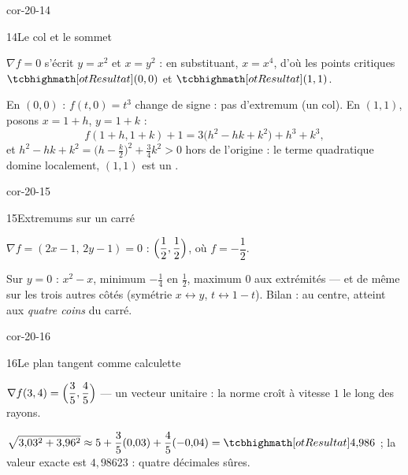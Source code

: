 \begin{blocLivre}{cor-20-14}
\begin{corrige}{14}{Le col et le sommet}
\begin{questions}
  \item $\nabla f=0$ s'écrit $y=x^{2}$ et $x=y^{2}$ : en substituant,
    $x=x^{4}$, d'où les points critiques $\res{(0,0)}$ et
    $\res{(1,1)}$.
  \item En $(0,0)$ : $f(t,0)=t^{3}$ change de signe : pas d'extremum
    (un col). En $(1,1)$, posons $x=1+h$, $y=1+k$ :
    \[
    f(1+h,1+k)+1=3\bigl(h^{2}-hk+k^{2}\bigr)+h^{3}+k^{3},
    \]
    et $h^{2}-hk+k^{2}=\bigl(h-\tfrac k2\bigr)^{2}+\tfrac34k^{2}>0$ hors
    de l'origine : le terme quadratique domine localement,
    $(1,1)$ est un .
\end{questions}
\end{corrige}
\end{blocLivre}

\begin{blocLivre}{cor-20-15}
\begin{corrige}{15}{Extremums sur un carré}
\begin{questions}
  \item $\nabla f=(2x-1,\,2y-1)=0$ :
    $\Bigl(\dfrac12,\dfrac12\Bigr)$, où
    $f=-\dfrac12$.
  \item Sur $y=0$ : $x^{2}-x$, minimum $-\frac14$ en $\frac12$, maximum
    $0$ aux extrémités — et de même sur les trois autres côtés (symétrie
    $x\leftrightarrow y$, $t\leftrightarrow1-t$). Bilan :
     au centre,
     atteint aux \emph{quatre coins} du
    carré.
\end{questions}
\end{corrige}
\end{blocLivre}

\begin{blocLivre}{cor-20-16}
\begin{corrige}{16}{Le plan tangent comme calculette}
\begin{questions}
  \item $\nabla f(3,4)=\Bigl(\dfrac35,\dfrac45\Bigr)$ — un vecteur
    unitaire : la norme croît à vitesse $1$ le long des rayons.
  \item $\sqrt{3{,}03^{2}+3{,}96^{2}}\approx5+\dfrac35(0{,}03)
    +\dfrac45(-0{,}04)=\res{4{,}986}$ ; la valeur exacte est
    $4{,}98623$ : quatre décimales sûres.
\end{questions}
\end{corrige}
\end{blocLivre}

